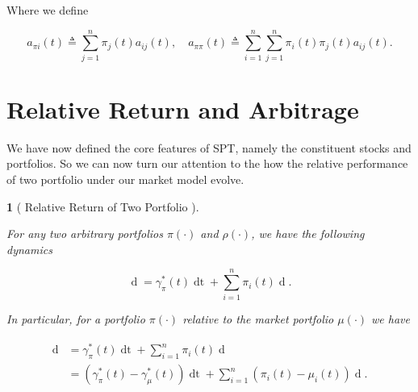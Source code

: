 \documentclass[british]{amsart} \usepackage{lmodern}
\numberwithin{equation}{section} \numberwithin{figure}{section}
\theoremstyle{plain} \newtheorem{thm}{\protect\theoremname}[section]
\theoremstyle{definition} \newtheorem{defn}[thm]{\protect\definitionname}
\theoremstyle{plain} \newtheorem{assumption}[thm]{\protect\assumptionname}
\theoremstyle{plain} \newtheorem{lem}[thm]{\protect\lemmaname}
\theoremstyle{plain} \newtheorem{prop}[thm]{\protect\propositionname}
\theoremstyle{remark} \newtheorem{rem}[thm]{\protect\remarkname}
\theoremstyle{plain} \newtheorem{cor}[thm]{\protect\corollaryname}
\renewcommand{\d}[1]{\mathop{\mathrm{d}{#1}}}
\newcommand{\defeq}{\mathop{\triangleq}} \newcommand{\almostsurely}{\text{a.s.}}
\begin{document}
Where we define

  \begin{equation}
      a_{\pi i}(t) \defeq \sum_{j=1}^{n} \pi_{j}(t)a_{ij}(t), \quad 
      a_{\pi \pi}(t) \defeq \sum_{i=1}^{n} \sum_{j=1}^{n} \pi_{i}(t) \pi_{j}(t) a_{ij}(t).
  \end{equation}

\newpage
\section{Relative Return and Arbitrage}

We have now defined the core features of SPT, namely the constituent stocks and
portfolios. So we can now turn our attention to the how the relative performance of
two portfolio under our market model evolve.

\begin{lem} 
  [
    {\cite[Lemma 3.2]{fernholz2009}}
    Relative Return of Two Portfolio
  ]
  \label{lem:relativereturnoftwoportfolios}

  For any two arbitrary portfolios $\pi(\cdot)$ and $\rho(\cdot)$, we have the
  following dynamics

  \begin{equation}    
    \label{eq:rrdynamics} 
      \d{\log{ \left( \frac{ V^{\pi}(t) }{V^{\rho}(t) } \right) } } = 
        \gamma_{\pi}^{*}(t)\d{t} + 
         \sum_{i=1}^{n} \pi_{i}(t) 
            \d{\log{ \left( \frac{ X_{i}(t) }{ V^{\rho}(t)} \right) }}. 
  \end{equation}

  In particular, for a portfolio $\pi(\cdot)$ relative to the market portfolio
  $\mu(\cdot)$ we have

  \begin{gather} 
    \label{eq:rrdynamics2} 
    \begin{split} 
      \d{ \log{ \left( \frac{V^{\pi}(t) }{ V^{\mu}(t) } \right) } } 
      &= \gamma_{\pi}^{*}(t)\d{t} + 
            \sum_{i=1}^{n} \pi_{i}(t)  \d{ \log{\mu_{i}(t)} } \\ 
      &= (\gamma_{\pi}^{*}(t) - \gamma_{\mu}^{*}(t)) \d{t} +
            \sum_{i=1}^{n} (\pi_{i}(t) - \mu_{i}(t)) \d{\log{\mu_{i}(t)} }.
    \end{split} 
  \end{gather}

\end{lem}
\end{document}
